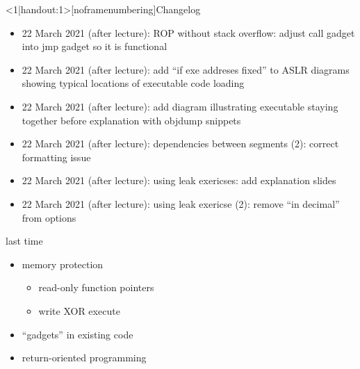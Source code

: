 \graphicspath{{./figures/}}
\title{}
\date{}

\begin{frame}
    \titlepage
\end{frame}

{
\begin{frame}<1|handout:1>[noframenumbering]{Changelog}
    \begin{itemize}
    \item 22 March 2021 (after lecture): ROP without stack overflow: adjust call gadget into jmp gadget so it is functional
    \item 22 March 2021 (after lecture): add ``if exe addreses fixed'' to ASLR diagrams showing typical locations of executable code loading
    \item 22 March 2021 (after lecture): add diagram illustrating executable staying together before explanation with objdump snippets
    \item 22 March 2021 (after lecture): dependencies between segments (2): correct formatting issue
    \item 22 March 2021 (after lecture): using leak exericses: add explanation slides
    \item 22 March 2021 (after lecture): using leak exericse (2): remove ``in decimal'' from options
    \end{itemize}
\end{frame}
}



\begin{frame}{last time}
    \begin{itemize}
    \item memory protection
        \begin{itemize}
        \item read-only function pointers
        \item write XOR execute
        \end{itemize}
    \item ``gadgets'' in existing code
    \item return-oriented programming
    \end{itemize}
\end{frame}

